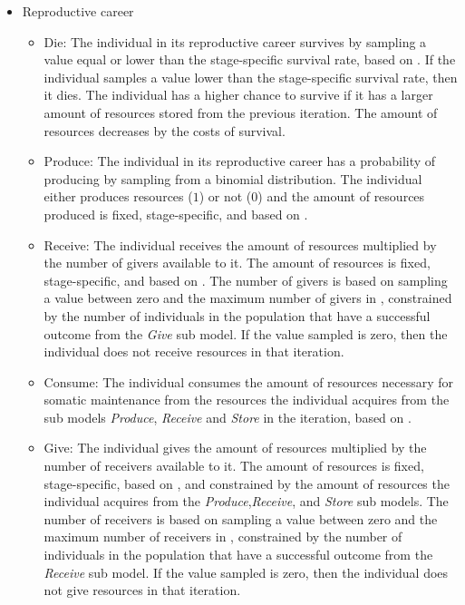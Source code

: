\documentclass{article}
\begin{document}
\begin{itemize}
\begin{itemize}
\begin{itemize}
        \end{itemize}
    \end{itemize}
    \item Reproductive career
    \begin{itemize}
        \item Die: The individual in its reproductive career survives by sampling a value equal or lower than the stage-specific survival rate, based on \cite{gurven2007longevity}. If the individual samples a value lower than the stage-specific survival rate, then it dies. The individual has a higher chance to survive if it has a larger amount of resources stored from the previous iteration. The amount of resources decreases by the costs of survival.
        \item Produce: The individual in its reproductive career has a probability of producing by sampling from a binomial distribution. The individual either produces resources ($1$) or not ($0$) and the amount of resources produced is fixed, stage-specific, and based on \cite{koster2020life}.
        \item Receive: The individual receives the amount of resources multiplied by the number of givers available to it. The amount of resources is fixed, stage-specific, and based on \cite{gurven2004give}. The number of givers is based on sampling a value between zero and the maximum number of givers in \cite{gurven2004give}, constrained by the number of individuals in the population that have a successful outcome from the \emph{Give} sub model. If the value sampled is zero, then the individual does not receive resources in that iteration. 
        \item Consume: The individual consumes the amount of resources necessary for somatic maintenance from the resources the individual acquires from the sub models \emph{Produce}, \emph{Receive} and \emph{Store} in the iteration, based on \cite{kaplan2000theory, pontzer2021daily}.
        \item Give: The individual gives the amount of resources multiplied by the number of receivers available to it. The amount of resources is fixed, stage-specific, based on \cite{gurven2004give}, and constrained by the amount of resources the individual acquires from the \emph{Produce},\emph{Receive}, and \emph{Store} sub models. The number of receivers is based on sampling a value between zero and the maximum number of receivers in \cite{gurven2004give}, constrained by the number of individuals in the population that have a successful outcome from the \emph{Receive} sub model. If the value sampled is zero, then the individual does not give resources in that iteration.

\end{itemize}
\end{itemize}
\end{document}
